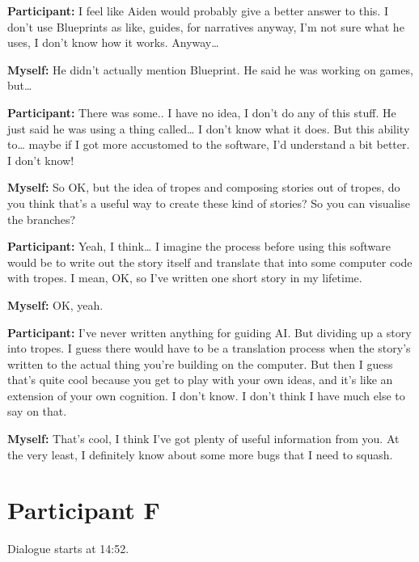 \documentclass[11pt]{report}
\newcommand{\llabel}[1]{\hypertarget{llineno:#1}{\linelabel{#1}}}
\begin{document}
\begin{linenumbers}
\textbf{Participant:} I feel like Aiden would probably give a better answer to this. I don't use Blueprints as like, guides, for narratives anyway, I'm not sure what he uses, I don't know how it works. Anyway\ldots{}

\textbf{Myself:} He didn't actually mention Blueprint. He said he was working on games, but\ldots{}

\textbf{Participant:} There was some.. I have no idea, I don't do any of this stuff. He just said he was using a thing called\ldots{} I don't know what it does. But this ability to\ldots{} maybe if I got more accustomed to the software, I'd understand a bit better. I don't know!

\textbf{Myself:} So OK, but the idea of tropes and composing stories out of tropes, do you think that's a useful way to create these kind of stories? So you can visualise the branches?

\textbf{Participant:} Yeah, I think\ldots{} I imagine the process before using this software would be to write out the story itself and translate that into some computer code with tropes. I mean, OK, so I've written one short story in my lifetime.\llabel{lne:use3e2}

\textbf{Myself:} OK, yeah.

\textbf{Participant:} I've never written anything for guiding AI. But dividing up a story into tropes. I guess there would have to be a translation process when the story's written to the actual thing you're building on the computer. But then I guess that's quite cool because you get to play with your own ideas, and it's like an extension of your own cognition. I don't know. I don't think I have much else to say on that.\llabel{lne:use3e3}

\textbf{Myself:} That's cool, I think I've got plenty of useful information from you. At the very least, I definitely know about some more bugs that I need to squash.

\end{linenumbers}
\resetlinenumber[1]
\section{Participant F}
Dialogue starts at 14:52.
\end{document}
